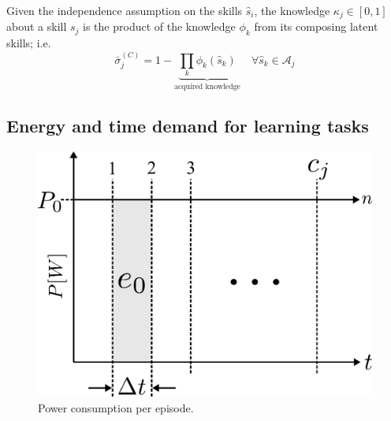 Given the independence assumption on the skills $ \hat{s}_i $, the knowledge $ \kappa_j \in [0,1]$ about a skill $ s_j $ is the product of the knowledge $ \phi_k $ from its composing latent skills; i.e.
\begin{equation}
\bar{\sigma}^{(C)}_j =1 - \underbrace{\prod_k \phi_k(\hat{s}_k) }_{\text{acquired knowledge}}   \quad \forall \hat{s}_k \in \mathcal{A}_j
\end{equation}


\newpage
\pagebreak
\hline


\subsection{Energy and time demand for learning tasks}

\begin{figure}[!ht]
	\centering
	\includegraphics[width=0.9\columnwidth]{fig/power_per_episode.pdf}
	\caption{Power consumption per episode.}
	\label{fig:power_per_episode}
\end{figure}

